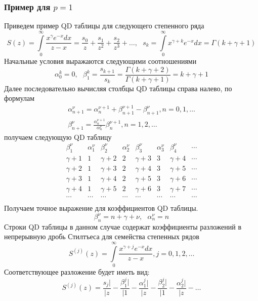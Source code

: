 \subsubsection{ Пример для $p=1$ } Приведем пример QD таблицы для
следующего степенного ряда
$$S(z) = \int\limits_{0}^{\infty}{ \frac{x^{\gamma}e^{-x} dx } {z-x}}=\frac{s_0}{z}+\frac{s_1}{z^2}+\frac{s_2}{z^3}+\ldots,\mbox{   }s_k = \int\limits_{0}^{\infty}{x^{\gamma+k} e^{-x}
dx}=\Gamma(k+\gamma+1)$$ Начальные условия выражаются следующими
соотношениями
$$
\alpha_0^k = 0, \mbox{   }
\beta_1^k=\frac{s_{k+1}}{s_k}=\frac{\Gamma(k+\gamma+2)}{\Gamma(k+\gamma+1)}=k+\gamma+1
$$
Далее последовательно вычисляя столбцы QD таблицы справа налево,
по формулам
\begin{eqnarray*} \alpha_{n+1}^{\nu} = \alpha_n^{\nu+1}+\beta_{n+1}^{\nu+1}-\beta_{n+1}^{\nu}, n=0,1,\ldots \nonumber\\
\beta_{n+1}^{\nu} =
\frac{\alpha_n^{\nu+1}}{\alpha_n^{\nu}}\beta_{n}^{\nu+1},
n=1,2,\ldots
\end{eqnarray*}
получаем следующую QD таблицу
$$%
\begin{array}{lllllllllllllll}
\beta_1^{\nu} & \alpha_1^{\nu} & \beta_2^{\nu} & \alpha_2^{\nu} & \beta_3^{\nu} & \alpha_3^{\nu} & \beta_4^{\nu} & \cdots \\
\gamma+1 & 1 & \gamma+2 & 2 & \gamma+3 & 3 & \gamma+4 & \cdots \\
\gamma+2 & 1 & \gamma+3 & 2 & \gamma+4 & 3 & \gamma+5 & \cdots \\
\gamma+3 & 1 & \gamma+4 & 2 & \gamma+5 & 3 & \gamma+6 & \cdots \\
\gamma+4 & 1 & \gamma+5 & 2 & \gamma+6 & 3 & \gamma+7 & \cdots \\
\cdots & \cdots & \cdots & \cdots & \cdots & \cdots & \cdots & \cdots \\
\end{array}
$$%
Получаем точное выражение для коэффициентов QD
таблицы.
$$ \beta_n^{\nu} = n+\gamma+\nu, \mbox{   } \alpha_n^{\nu} = n$$
Строки QD таблицы в данном случае содержат коэффициенты
разложений в непрерывную дробь Стилтъеса для семейства степенных
рядов
$$ S^{(j)}(z) = \int\limits_{0}^{\infty}{ \frac{x^{\gamma+j}e^{-x} dx } {z-x}},j=0,1,2,\ldots $$
Соответствующее разложение будет иметь вид:
$$ S^{(j)}(z)=\frac{s_j|}{|z}-\frac{\beta_1^j|}{|1}-\frac{\alpha_1^j|}{|z}-\frac{\beta_2^j|}{|1}-\frac{\alpha_2^j|}{|z}- \ldots $$

